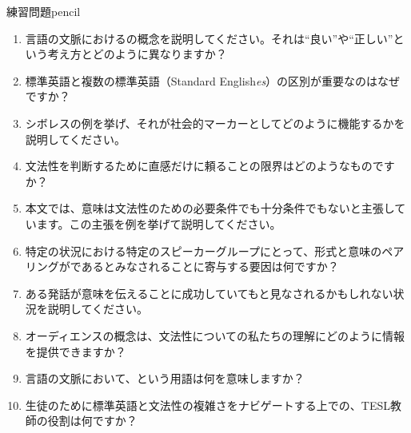 \begin{tblsframedsymbol}{練習問題}{pencil}

\begin{enumerate}[noitemsep, leftmargin=*]
    \item 言語の文脈におけるの概念を説明してください。それは\enquote{良い}や\enquote{正しい}という考え方とどのように異なりますか？
    \item 標準英語と複数の標準英語（Standard English\emph{es}）の区別が重要なのはなぜですか？
    \item シボレスの例を挙げ、それが社会的マーカーとしてどのように機能するかを説明してください。
    \item 文法性を判断するために直感だけに頼ることの限界はどのようなものですか？
    \item 本文では、意味は文法性のための必要条件でも十分条件でもないと主張しています。この主張を例を挙げて説明してください。
    \item 特定の状況における特定のスピーカーグループにとって、形式と意味のペアリングがであるとみなされることに寄与する要因は何ですか？
    \item ある発話が意味を伝えることに成功していてもと見なされるかもしれない状況を説明してください。
    \item オーディエンスの概念は、文法性についての私たちの理解にどのように情報を提供できますか？
    \item 言語の文脈において、という用語は何を意味しますか？
    \item 生徒のために標準英語と文法性の複雑さをナビゲートする上での、TESL教師の役割は何ですか？
\end{enumerate}

\end{tblsframedsymbol}

